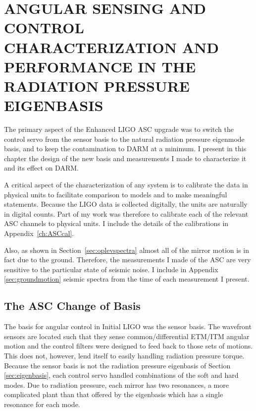 \chapter{ANGULAR SENSING AND CONTROL CHARACTERIZATION AND PERFORMANCE
  IN THE RADIATION PRESSURE EIGENBASIS}
\label{ch:characterization}





The primary aspect of the Enhanced LIGO ASC upgrade was to switch the
control servo from the sensor basis to the natural radiation pressure
eigenmode basis, and to keep the contamination to DARM at a minimum. I
present in this chapter the design of the new basis and measurements I
made to characterize it and its effect on DARM.

A critical aspect of the characterization of any system is to
calibrate the data in physical units to facilitate comparison to
models and to make meaningful statements. Because the LIGO data is
collected digitally, the units are naturally in digital counts. Part
of my work was therefore to calibrate each of the relevant ASC
channels to physical units. I include the details of the calibrations
in Appendix~\ref{ch:ASCcal}.

Also, as shown in Section~\ref{sec:oplevspectra} almost all of the mirror
motion is in fact due to the ground. Therefore, the measurements I
made of the ASC are very sensitive to the particular state of seismic
noise. I include in Appendix \ref{sec:groundmotion} seismic spectra
from the time of each measurement I present.




\section{The ASC Change of Basis}
The basis for angular control in Initial LIGO was the sensor
basis. The wavefront sensors are located such that they sense
common/differential ETM/ITM angular motion and the control filters
were designed to feed back to those sets of motions. This does not,
however, lend itself to easily handling radiation pressure
torque. Because the sensor basis is not the radiation pressure eigenbasis
of Section \ref{sec:eigenbasis}, each control servo handled
combinations of the soft and hard modes. Due to radiation pressure,
each mirror has two resonances, a more complicated plant than that
offered by the eigenbasis which has a single resonance for each mode.

